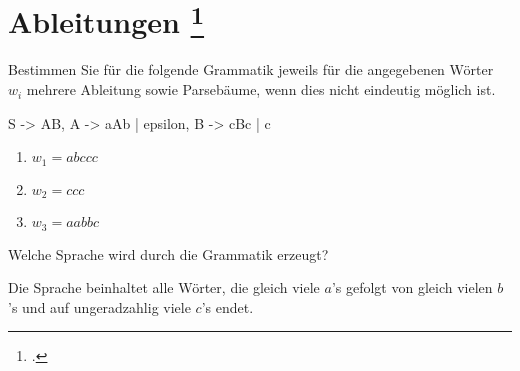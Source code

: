 \documentclass{lehramt-informatik-aufgabe}
\begin{document}
\section{Ableitungen
\footcite{theo:ab:2}}

Bestimmen Sie für die folgende Grammatik jeweils für die angegebenen
Wörter $w_i$ mehrere Ableitung sowie Parsebäume, wenn dies nicht eindeutig
möglich ist.

\begin{liProduktionsRegeln}
S -> AB,
A -> aAb | epsilon,
B -> cBc | c
\end{liProduktionsRegeln}

\begin{enumerate}


\item $w_1 = abccc$


\item $w_2 = ccc$


\item $w_3 = aabbc$
\end{enumerate}
Welche Sprache wird durch die Grammatik erzeugt?

\begin{liAntwort}
Die Sprache beinhaltet alle Wörter, die gleich viele $a$’s gefolgt von
gleich vielen $b$’s und auf ungeradzahlig viele $c$’s endet.
\end{liAntwort}
\end{document}
